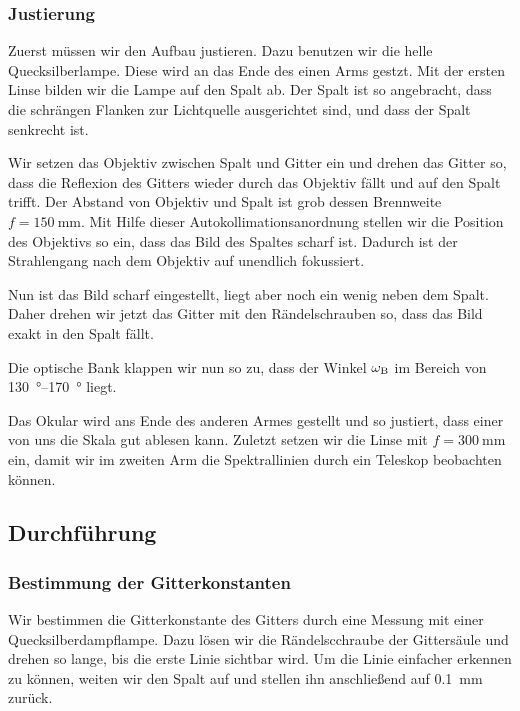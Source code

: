 \FloatBarrier
\subsubsection{Justierung}

Zuerst müssen wir den Aufbau justieren. Dazu benutzen wir die helle
Quecksilberlampe. Diese wird an das Ende des einen Arms gestzt. Mit der ersten
Linse bilden wir die Lampe auf den Spalt ab. Der Spalt ist so angebracht, dass
die schrängen Flanken zur Lichtquelle ausgerichtet sind, und dass der Spalt
senkrecht ist.

Wir setzen das Objektiv zwischen Spalt und Gitter ein und drehen das Gitter so,
dass die Reflexion des Gitters wieder durch das Objektiv fällt und auf den
Spalt trifft. Der Abstand von Objektiv und Spalt ist grob dessen Brennweite $f
= \SI{150}{\milli\meter}$. Mit Hilfe dieser Autokollimationsanordnung stellen
wir die Position des Objektivs so ein, dass das Bild des Spaltes scharf ist.
Dadurch ist der Strahlengang nach dem Objektiv auf unendlich fokussiert.

Nun ist das Bild scharf eingestellt, liegt aber noch ein wenig neben dem Spalt.
Daher drehen wir jetzt das Gitter mit den Rändelschrauben so, dass das Bild
exakt in den Spalt fällt.

Die optische Bank klappen wir nun so zu, dass der Winkel $\omega_\text B$ im
Bereich von \SIrange{130}{170}{\degree} liegt.

Das Okular wird ans Ende des anderen Armes gestellt und so justiert, dass einer
von uns die Skala gut ablesen kann. Zuletzt setzen wir die Linse mit $f =
\SI{300}{\milli\meter}$ ein, damit wir im zweiten Arm die Spektrallinien durch
ein Teleskop beobachten können.

\FloatBarrier
\subsection{Durchführung}

\FloatBarrier
\subsubsection{Bestimmung der Gitterkonstanten}

Wir bestimmen die Gitterkonstante des Gitters durch eine Messung mit einer
Quecksilberdampflampe. Dazu lösen wir die Rändelscchraube der Gittersäule und
drehen so lange, bis die erste Linie sichtbar wird. Um die Linie einfacher
erkennen zu können, weiten wir den Spalt auf und stellen ihn anschließend auf
\SI{0.1}{\milli\meter} zurück.

